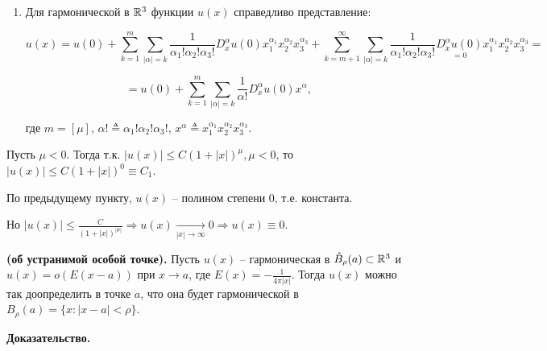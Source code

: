 \begin{enumerate}
{} 


\item{

Для гармонической в $\mathbb{R}^3$ функции $u(x)$ справедливо представление:

$$
u(x) = u(0) + \sum_{k=1}^{m} \sum_{|\alpha|=k} \frac{1}
{\alpha_1! \alpha_2! \alpha_3!} D_x^{\alpha} u(0) 
x_1^{\alpha_1}x_2^{\alpha_2}x_3^{\alpha_3}
+
\sum_{k=m+1}^{\infty} \sum_{|\alpha|=k} \frac{1}
{\alpha_1! \alpha_2! \alpha_3!} \underset{=0}{D_x^{\alpha} u(0)}
x_1^{\alpha_1}x_2^{\alpha_2}x_3^{\alpha_3}
=
$$

$$
=
u(0) + \sum_{k=1}^{m} \sum_{|\alpha|=k} \frac{1}
{\alpha !} D_x^{\alpha} u(0) 
x^{\alpha},
$$

где $m = [\mu], \, \alpha ! \triangleq \alpha_1!\alpha_2!\alpha_3!, \, x^\alpha \triangleq x_1^{\alpha_1}x_2^{\alpha_2}x_3^{\alpha_3}$.



}

\end{enumerate}







Пусть $\mu<0$. Тогда т.к. $|u(x)|\le C(1+|x|)^\mu, \mu<0$, то
$|u(x)| \le C (1+|x|)^0 \equiv C_1$. 

По предыдущему пункту, $u(x)$ -- полином степени 0, т.е. константа.

Но $|u(x)| \le \frac{C}{(1+|x|)^{|\mu|}} \Rightarrow u(x) 
\underset{|x| \to \infty}{\longrightarrow}
0   \Rightarrow u(x) \equiv 0$.




\begin{theorem}

{\bf (об  устранимой особой точке).} 
Пусть $u(x)$ -- гармоническая в $\mathring{B}_\rho(a) \subset 
\mathbb{R}^3$ и $u(x)=o(E(x-a))$ при $x \to a$, где $E(x) = -\frac{1}{4 \pi |x|}$. Тогда $u(x)$ можно так доопределить в точке $a$, что она будет гармонической в $B_\rho(a) = \{x: |x-a|<\rho \}$.

\end{theorem}

\textbf{Доказательство.}


